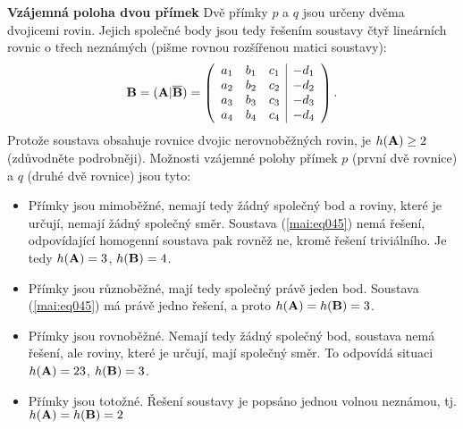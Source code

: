 \wikitextrule
\begin{example}\label{mai:exam044}
  \textbf{Vzájemná poloha dvou přímek}\newline\small
  Dvě přímky \(p\) a \(q\) jsou určeny dvěma dvojicemi rovin. Jejich společné body jsou tedy 
  řešením soustavy čtyř lineárních rovnic o třech neznámých (pišme rovnou rozšířenou matici 
  soustavy):
  \begin{equation}\label{mai:eq045}
    \mathbf{B} = (\mathbf{A}|\overline{\mathbf{B}}) =
    \left(
      \begin{array}{rrr|r}
         a_1 & b_1 & c_1 & -d_1    \\
         a_2 & b_2 & c_2 & -d_2    \\
         a_3 & b_3 & c_3 & -d_3    \\
         a_4 & b_4 & c_4 & -d_4
      \end{array}
    \right).
  \end{equation}
  Protože soustava obsahuje rovnice dvojic nerovnoběžných rovin, je \(h(\mathbf{A}) \geq 2\) 
  (zdůvodněte podrobněji). Možnosti vzájemné polohy přímek \(p\) (první dvě rovnice) a \(q\) (druhé 
  dvě rovnice) jsou tyto:
  \begin{itemize}
    \item Přímky jsou mimoběžné, nemají tedy žádný společný bod a roviny, které je určují, nemají 
          žádný společný směr. Soustava (\ref{mai:eq045}) nemá řešení, odpovídající homogenní 
          soustava pak rovněž ne, kromě řešení triviálního. Je tedy \(h(\mathbf{A}) = 3\), 
          \(h(\mathbf{B}) = 4\).
    \item Přímky jsou různoběžné, mají tedy společný právě jeden bod. Soustava (\ref{mai:eq045}) má 
          právě jedno řešení, a proto \(h(\mathbf{A}) = h(\mathbf{B}) = 3\).
    \item Přímky jsou rovnoběžné. Nemají tedy žádný společný bod, soustava nemá řešení, ale roviny, 
          které je určují, mají společný směr. To odpovídá situaci \(h(\mathbf{A}) = 23\), 
          \(h(\mathbf{B}) = 3\).
    \item Přímky jsou totožné. Řešení soustavy je popsáno jednou volnou neznámou, tj. \(h(\mathbf{A}) 
          = h(\mathbf{B}) = 2\)
  \end{itemize}
  \normalsize
\end{example}
